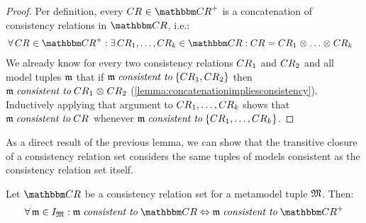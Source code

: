\begin{proof}
    Per definition, every $\consistencyrelation{CR}{} \in \transitiveclosure{\consistencyrelationset{CR}}$ is a concatenation of consistency relations in $\consistencyrelationset{CR}$, i.e.:
    \begin{align*}
        &
        \forall \consistencyrelation{CR}{} \in \transitiveclosure{\consistencyrelationset{CR}} : \exists \consistencyrelation{CR}{1}, \dots, \consistencyrelation{CR}{k} \in \consistencyrelationset{CR} : %
        \consistencyrelation{CR}{} = \consistencyrelation{CR}{1} \concat \dots \concat \consistencyrelation{CR}{k}
    \end{align*}
    We already know for every two consistency relations $\consistencyrelation{CR}{1}$ and $\consistencyrelation{CR}{2}$ and all model tuples $\modeltuple{m}$ that if $\modeltuple{m} \consistenttomath \setted{\consistencyrelation{CR}{1}, \consistencyrelation{CR}{2}}$ then $\modeltuple{m} \consistenttomath \consistencyrelation{CR}{1} \concat \consistencyrelation{CR}{2}$ (\autoref{lemma:concatenationimpliesconsistency}).
    Inductively applying that argument to $\consistencyrelation{CR}{1}, \dots, \consistencyrelation{CR}{k}$ shows that $\modeltuple{m} \consistenttomath \consistencyrelation{CR}{}$ whenever $\modeltuple{m} \consistenttomath \setted{\consistencyrelation{CR}{1}, \dots, \consistencyrelation{CR}{k}}$.
\end{proof}

As a direct result of the previous lemma, we can show that the transitive closure of a consistency relation set considers the same tuples of models consistent as the consistency relation set itself.

\begin{lemma} \label{lemma:consistencytransitiveclosure}
    Let $\consistencyrelationset{CR}$ be a consistency relation set for a metamodel tuple $\metamodeltuple{M}$.
    Then:
    \begin{align*}
        \forall \modeltuple{m} \in \metamodeltupleinstanceset{M}: \modeltuple{m} \consistenttomath \consistencyrelationset{CR} \equivalent
        \modeltuple{m} \consistenttomath \transitiveclosure{\consistencyrelationset{CR}}
    \end{align*}
\end{lemma}

